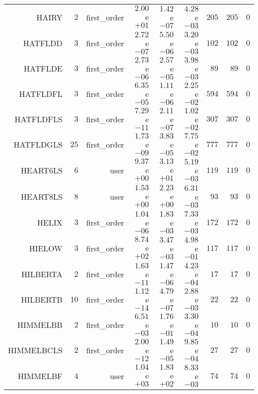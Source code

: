 \begin{longtable}{rrrrrrrrr}
HAIRY & \(     2\) & first\_order & \( 2.00\)e\(+01\) & \( 1.42\)e\(-07\) & \( 4.28\)e\(-03\) & \(   205\) & \(   205\) & \(     0\) \\
HATFLDD & \(     3\) & first\_order & \( 2.72\)e\(-07\) & \( 5.50\)e\(-06\) & \( 3.20\)e\(-03\) & \(   102\) & \(   102\) & \(     0\) \\
HATFLDE & \(     3\) & first\_order & \( 2.73\)e\(-06\) & \( 2.57\)e\(-05\) & \( 3.98\)e\(-03\) & \(    89\) & \(    89\) & \(     0\) \\
HATFLDFL & \(     3\) & first\_order & \( 6.35\)e\(-05\) & \( 1.11\)e\(-06\) & \( 2.25\)e\(-02\) & \(   594\) & \(   594\) & \(     0\) \\
HATFLDFLS & \(     3\) & first\_order & \( 7.29\)e\(-11\) & \( 2.11\)e\(-07\) & \( 1.02\)e\(-02\) & \(   307\) & \(   307\) & \(     0\) \\
HATFLDGLS & \(    25\) & first\_order & \( 1.73\)e\(-09\) & \( 3.83\)e\(-05\) & \( 7.75\)e\(-02\) & \(   777\) & \(   777\) & \(     0\) \\
HEART6LS & \(     6\) & user & \( 9.37\)e\(+00\) & \( 3.13\)e\(+01\) & \( 5.19\)e\(-03\) & \(   119\) & \(   119\) & \(     0\) \\
HEART8LS & \(     8\) & user & \( 1.53\)e\(+00\) & \( 2.23\)e\(+00\) & \( 6.31\)e\(-03\) & \(    93\) & \(    93\) & \(     0\) \\
HELIX & \(     3\) & first\_order & \( 1.04\)e\(-06\) & \( 1.83\)e\(-03\) & \( 7.33\)e\(-03\) & \(   172\) & \(   172\) & \(     0\) \\
HIELOW & \(     3\) & first\_order & \( 8.74\)e\(+02\) & \( 3.47\)e\(-03\) & \( 4.98\)e\(-01\) & \(   117\) & \(   117\) & \(     0\) \\
HILBERTA & \(     2\) & first\_order & \( 1.63\)e\(-11\) & \( 1.47\)e\(-06\) & \( 4.23\)e\(-04\) & \(    17\) & \(    17\) & \(     0\) \\
HILBERTB & \(    10\) & first\_order & \( 1.12\)e\(-14\) & \( 4.79\)e\(-07\) & \( 2.88\)e\(-03\) & \(    22\) & \(    22\) & \(     0\) \\
HIMMELBB & \(     2\) & first\_order & \( 6.51\)e\(-03\) & \( 1.76\)e\(-01\) & \( 3.30\)e\(-04\) & \(    10\) & \(    10\) & \(     0\) \\
HIMMELBCLS & \(     2\) & first\_order & \( 2.00\)e\(-12\) & \( 1.49\)e\(-05\) & \( 9.85\)e\(-04\) & \(    27\) & \(    27\) & \(     0\) \\
HIMMELBF & \(     4\) & user & \( 1.04\)e\(+03\) & \( 1.83\)e\(+02\) & \( 8.33\)e\(-03\) & \(    74\) & \(    74\) & \(     0\) \\

\end{longtable}
